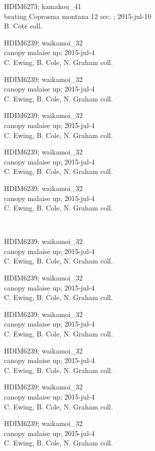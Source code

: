 \documentclass[2pt]{extarticle}
\begin{document}
\noindent
\parbox{0.16\textwidth}{\tiny \raggedright \rule[-0.3\baselineskip]{0pt}{10pt}HDIM6273; kamakou\_41\\ beating Coprosma montana 12 sec. ; 2015-jul-10\\ B. Cote coll.}
\parbox{0.16\textwidth}{\tiny \raggedright \rule[-0.3\baselineskip]{0pt}{10pt}HDIM6239; waikamoi\_32\\ canopy malaise up; 2015-jul-4\\ C. Ewing, B. Cole, N. Graham coll.}
\parbox{0.16\textwidth}{\tiny \raggedright \rule[-0.3\baselineskip]{0pt}{10pt}HDIM6239; waikamoi\_32\\ canopy malaise up; 2015-jul-4\\ C. Ewing, B. Cole, N. Graham coll.}
\parbox{0.16\textwidth}{\tiny \raggedright \rule[-0.3\baselineskip]{0pt}{10pt}HDIM6239; waikamoi\_32\\ canopy malaise up; 2015-jul-4\\ C. Ewing, B. Cole, N. Graham coll.}
\parbox{0.16\textwidth}{\tiny \raggedright \rule[-0.3\baselineskip]{0pt}{10pt}HDIM6239; waikamoi\_32\\ canopy malaise up; 2015-jul-4\\ C. Ewing, B. Cole, N. Graham coll.}
\parbox{0.16\textwidth}{\tiny \raggedright \rule[-0.3\baselineskip]{0pt}{10pt}HDIM6239; waikamoi\_32\\ canopy malaise up; 2015-jul-4\\ C. Ewing, B. Cole, N. Graham coll.} \\ 
\vspace{0.001in} 

\noindent
\parbox{0.16\textwidth}{\tiny \raggedright \rule[-0.3\baselineskip]{0pt}{10pt}HDIM6239; waikamoi\_32\\ canopy malaise up; 2015-jul-4\\ C. Ewing, B. Cole, N. Graham coll.}
\parbox{0.16\textwidth}{\tiny \raggedright \rule[-0.3\baselineskip]{0pt}{10pt}HDIM6239; waikamoi\_32\\ canopy malaise up; 2015-jul-4\\ C. Ewing, B. Cole, N. Graham coll.}
\parbox{0.16\textwidth}{\tiny \raggedright \rule[-0.3\baselineskip]{0pt}{10pt}HDIM6239; waikamoi\_32\\ canopy malaise up; 2015-jul-4\\ C. Ewing, B. Cole, N. Graham coll.}
\parbox{0.16\textwidth}{\tiny \raggedright \rule[-0.3\baselineskip]{0pt}{10pt}HDIM6239; waikamoi\_32\\ canopy malaise up; 2015-jul-4\\ C. Ewing, B. Cole, N. Graham coll.}
\parbox{0.16\textwidth}{\tiny \raggedright \rule[-0.3\baselineskip]{0pt}{10pt}HDIM6239; waikamoi\_32\\ canopy malaise up; 2015-jul-4\\ C. Ewing, B. Cole, N. Graham coll.}
\parbox{0.16\textwidth}{\tiny \raggedright \rule[-0.3\baselineskip]{0pt}{10pt}HDIM6239; waikamoi\_32\\ canopy malaise up; 2015-jul-4\\ C. Ewing, B. Cole, N. Graham coll.} \\ 
\vspace{0.001in} 
\end{document}
